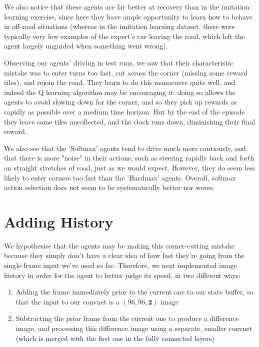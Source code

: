 \documentclass[a4paper, 11pt, conference]{ieeeconf}      %
\begin{document}
We also notice that these agents are far better at recovery than in the imitation learning exercise, since here they have ample opportunity to learn how to behave in off-road situations (whereas in the imitation learning dataset, there were typically very few examples of the expert's car leaving the road, which left the agent largely unguided when something went wrong).

Observing our agents' driving in test runs, we saw that their characteristic mistake was to enter turns too fast, cut across the corner (missing some reward tiles), and rejoin the road. They learn to do this manoeuvre quite well, and indeed the Q learning algorithm may be encouraging it: doing so allows the agents to avoid slowing down for the corner, and so they pick up rewards as rapidly as possible over a medium time horizon. But by the end of the episode they leave some tiles uncollected, and the clock runs down, diminishing their final reward.

We also see that the 'Softmax' agents tend to drive much more cautiously, and that there is more "noise" in their actions, such as steering rapidly back and forth on straight stretches of road, just as we would expect. However, they do seem less likely to enter corners too fast than the 'Hardmax' agents. Overall, softmax action selection does not seem to be systematically better nor worse.

\section{Adding History}

We hypothesise that the agents may be making this corner-cutting mistake because they simply don't have a clear idea of how fast they're going from the single-frame input we've used so far. Therefore, we next implemented image history in order for the agent to better judge its speed, in two different ways:

\begin{enumerate}
	\item Adding the frame immediately prior to the current one to our state buffer, so that the input to our convnet is a $(96, 96, \textbf{2})$ image

	\item Subtracting the prior frame from the current one to produce a difference image, and processing this difference image using a separate, smaller convnet (which is merged with the first one in the fully connected layers)
\end{enumerate}
\end{document}
